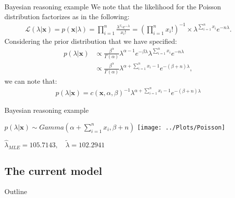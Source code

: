 \documentclass[xcolor=dvipsnames]{beamer}
\begin{document}
\begin{frame}{Bayesian reasoning example}
		We note that the likelihood for the Poisson distribution factorizes as in the following:
		\begin{align*}
		\mathcal{L}(\lambda|\textbf{x})=p(\textbf{x}|\lambda)=\prod_{i=1}^n \frac{\lambda^{x_i}e^{-\lambda}}{x_i!}= \left( \prod_{i=1}^n x_i! \right)^{-1} \times \lambda^{\sum_{i=1}^n x_i} e^{-n\lambda}. 
		\label{eq:poissonLik}
		\end{align*}
		Considering the prior distribution that we have specified:
		\begin{align*}
		p(\lambda|\textbf{x})&\propto \frac{\beta^{\alpha}}{\Gamma(\alpha)}\lambda^{\alpha-1}e^{-\beta \lambda} \lambda^{\sum_{i=1}^n x_i} e^{-n\lambda} \\
		&\propto \frac{\beta^{\alpha}}{\Gamma(\alpha)} \lambda^{\alpha + \sum_{i=1}^n x_i -1} e^{-(\beta+n)\lambda},
		\end{align*}
		we can note that:
		\begin{align*}
		p(\lambda|\textbf{x}) =c(\textbf{x},\alpha,\beta)^{-1} \lambda^{\alpha + \sum_{i=1}^n x_i -1} e^{-(\beta+n)\lambda}
		\end{align*}
\end{frame}

\begin{frame}{Bayesian reasoning example}
	\vspace{-5pt}
	\begin{center}
		$p(\lambda|\textbf{x})\sim Gamma(\alpha+ \sum_{i=1}^n x_i, \beta+n)$
		\texttt{[image: ../Plots/Poisson]}
		
		$\hat{\lambda}_{MLE}=105.7143, \quad \tilde{\lambda}=102.2941$
	\end{center}
\end{frame}

\subsection{The current model}
\begin{frame}{Outline}
	\vspace{-10.5pt}
	\tableofcontents[currentsection,subsectionstyle=show/shaded/hide]
\end{frame}
\end{document}
